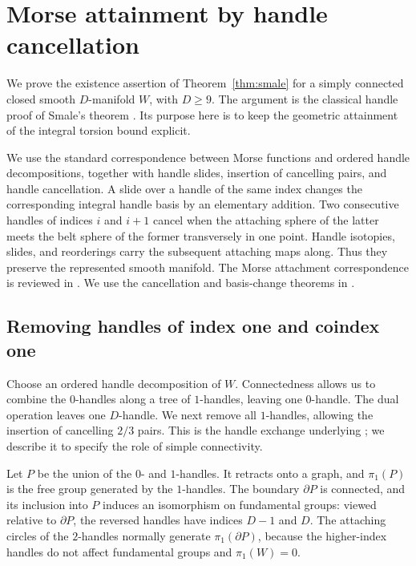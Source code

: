\section{Morse attainment by handle cancellation}\label{app:handles}

We prove the existence assertion of Theorem~\ref{thm:smale} for a simply
connected closed smooth $D$-manifold $W$, with $D\geq9$.
The argument is the classical handle proof of Smale's theorem
\cite[Theorem~2.4]{Smale1963}.  Its purpose here is to keep the geometric
attainment of the integral torsion bound explicit.

We use the standard correspondence between Morse functions and ordered
handle decompositions, together with handle slides, insertion of
cancelling pairs, and handle cancellation.  A slide over a handle of the
same index changes the corresponding integral handle basis by an
elementary addition.  Two consecutive handles of indices $i$ and $i+1$
cancel when the attaching sphere of the latter meets the belt sphere of
the former transversely in one point.  Handle isotopies, slides, and
reorderings carry the subsequent attaching maps along.  Thus they preserve
the represented smooth manifold.  The Morse attachment correspondence is
reviewed in \cite{Milnor1963}.  We use the cancellation and basis-change
theorems in \cite[Theorems~5.4 and~7.6]{Milnor1965}.

\subsection{Removing handles of index one and coindex one}

Choose an ordered handle decomposition of $W$.  Connectedness allows us
to combine the $0$-handles along a tree of $1$-handles, leaving one
$0$-handle.  The dual operation leaves one $D$-handle.  We next remove
all $1$-handles, allowing the insertion of cancelling $2/3$ pairs.
This is the handle exchange underlying
\cite[Theorem~8.1]{Milnor1965}; we describe it to specify the role of
simple connectivity.

Let $P$ be the union of the $0$- and $1$-handles.  It retracts onto a
graph, and $\pi_1(P)$ is the free group generated by the $1$-handles.
The boundary $\partial P$ is connected, and its inclusion into $P$
induces an isomorphism on fundamental groups: viewed relative to
$\partial P$, the reversed handles have indices $D-1$ and $D$.
The attaching circles of the $2$-handles normally generate
$\pi_1(\partial P)$, because the higher-index handles do not affect
fundamental groups and $\pi_1(W)=0$.

